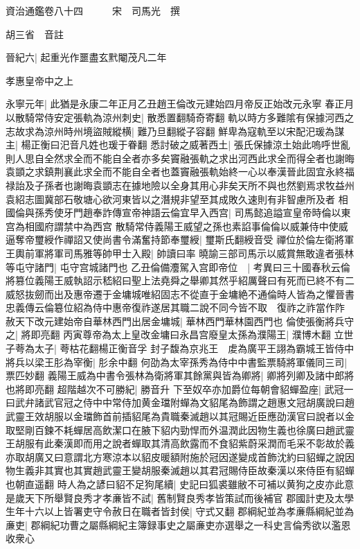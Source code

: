 資治通鑑卷八十四　　　宋　司馬光　撰

胡三省　音註

晉紀六|{
	起重光作噩盡玄黓閹茂凡二年}


孝惠皇帝中之上

永寧元年|{
	此猶是永康二年正月乙丑趙王倫改元建始四月帝反正始改元永寧}
春正月以散騎常侍安定張軌為涼州刺史|{
	散悉置翻騎奇寄翻}
軌以時方多難隂有保據河西之志故求為涼州時州境盜賊縱横|{
	難乃旦翻縱子容翻}
鮮卑為寇軌至以宋配汜瑗為謀主|{
	楊正衡曰汜音凡姓也瑗于眷翻}
悉討破之威著西土|{
	張氏保據涼土始此嗚呼世亂則人思自全然求全而不能自全者亦多矣竇融張軌之求出河西此求全而得全者也謝晦袁顗之求鎮荆襄此求全而不能自全者也蓋竇融張軌始終一心以奉漢晉此固宜永終福禄詒及子孫者也謝晦袁顗志在據地險以全身其用心非矣天所不與也然劉焉求牧益州袁紹志圖冀部石敬塘心欲河東皆以之潛規非望至其成敗久速則有非智慮所及者}
相國倫與孫秀使牙門趙奉詐傳宣帝神語云倫宜早入西宫|{
	司馬懿追謚宣皇帝時倫以東宫為相國府謂禁中為西宫}
散騎常侍義陽王威望之孫也素諂事倫倫以威兼侍中使威逼奪帝璽綬作禪詔又使尚書令滿奮持節奉璽綬|{
	璽斯氏翻綬音受}
禪位於倫左衛將軍王輿前軍將軍司馬雅等帥甲士入殿|{
	帥讀曰率}
曉諭三部司馬示以威賞無敢違者張林等屯守諸門|{
	屯守宫城諸門也}
乙丑倫備灋駕入宫即帝位　|{
	考異曰三十國春秋云倫將篡位義陽王威執詔示嵇紹曰聖上法堯舜之舉卿其然乎紹厲聲曰有死而已終不有二威怒抜劒而出及惠帝遷于金墉城唯紹固志不從直于金墉絶不通倫時人皆為之懼晉書忠義傳云倫簒位紹為侍中惠帝復祚遂居其職二說不同今皆不取　復祚之祚當作阼}
赦天下改元建始帝自華林西門出居金墉城|{
	華林西門華林園西門也}
倫使張衡將兵守之|{
	將即亮翻}
丙寅尊帝為太上皇改金墉曰永昌宫廢皇太孫為濮陽王|{
	濮博木翻}
立世子荂為太子|{
	荂枯花翻楊正衡音孚}
封子馥為京兆王　䖍為廣平王詡為霸城王皆侍中將兵以梁王肜為宰衡|{
	肜余中翻}
何劭為太宰孫秀為侍中中書監票騎將軍儀同三司|{
	票匹妙翻}
義陽王威為中書令張林為衛將軍其餘黨與皆為卿將|{
	卿將列卿及諸中郎將也將即亮翻}
超階越次不可勝紀|{
	勝音升}
下至奴卒亦加爵位每朝會貂蟬盈座|{
	武冠一曰武弁諸武官冠之侍中中常侍加黄金璫附蟬為文貂尾為飾謂之趙惠文冠胡廣說曰趙武靈王效胡服以金璫飾首前插貂尾為貴職秦滅趙以其冠賜近臣應劭漢官曰說者以金取堅剛百鍊不耗蟬居高飲潔口在腋下貂内勁悍而外温潤此因物生義也徐廣曰趙武靈王胡服有此秦漢即而用之說者蟬取其清高飲露而不食貂紫蔚采潤而毛采不彰故於義亦取胡廣又曰意謂北方寒涼本以貂皮暖額附施於冠因遂變成首飾沈約曰貂蟬之說因物生義非其實也其實趙武靈王變胡服秦滅趙以其君冠賜侍臣故秦漢以來侍臣有貂蟬也朝直遥翻}
時人為之諺曰貂不足狗尾續|{
	史記曰狐裘雖敝不可補以黄狗之皮亦此意}
是歲天下所舉賢良秀才孝亷皆不試|{
	舊制賢良秀孝皆策試而後補官}
郡國計吏及太學生年十六以上皆署吏守令赦日在職者皆封侯|{
	守式又翻}
郡綱紀並為孝亷縣綱紀並為亷吏|{
	郡綱紀功曹之屬縣綱紀主簿録事史之屬亷吏亦選舉之一科史言倫秀欲以濫恩收衆心}

